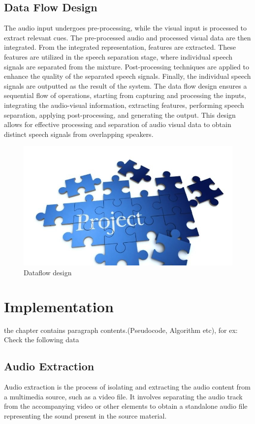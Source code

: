 \documentclass[12pt,a4paper]{report}
\begin{document}
\section{Data Flow Design}
\par
The audio input undergoes pre-processing, while the visual input is processed to extract relevant cues. The pre-processed audio and processed visual data are then integrated. From the integrated representation, features are extracted. These features are utilized in the speech separation stage, where individual speech signals are separated from the mixture. Post-processing techniques are applied to enhance the quality of the separated speech signals. Finally, the individual speech signals are outputted as the result of the system. The data flow design ensures a sequential flow of operations, starting from capturing and processing the inputs, integrating the audio-visual information, extracting features, performing speech separation, applying post-processing, and generating the output. This design allows for effective processing and separation of audio visual data to obtain distinct speech signals from overlapping speakers.
\\
\begin{figure}[hbtp]
\centering
\includegraphics[scale=0.8]{./pic/sample.jpg}
\caption{Dataflow design}
\end{figure}




\chapter{Implementation}
the chapter contains paragraph contents.(Pseudocode, Algorithm etc), for ex: Check the following data
\section{Audio Extraction}
\par
Audio extraction is the process of isolating and extracting the audio content from a multimedia source, such as a video file. It involves separating the audio track from the accompanying video or other elements to obtain a standalone audio file representing the sound present in the source material.
\end{document}
